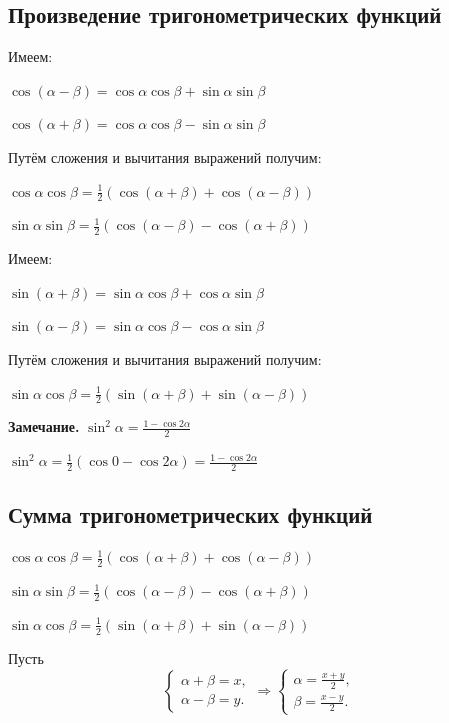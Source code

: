 \documentclass{article}
\begin{document}
        \subsection{Произведение тригонометрических функций}
        
        Имеем:
        
        \(\cos{(\alpha - \beta)} = \cos{\alpha}\cos{\beta} + \sin{\alpha}\sin{\beta}\)
        
        \(\cos{(\alpha + \beta)} = \cos{\alpha}\cos{\beta} - \sin{\alpha}\sin{\beta}\)
        
        Путём сложения и вычитания выражений получим:
        
        \(\cos{\alpha}\cos{\beta} = \frac{1}{2}(\cos{(\alpha + \beta)} + \cos{(\alpha - \beta)})\)
        
        \(\sin{\alpha}\sin{\beta} = \frac{1}{2}(\cos{(\alpha - \beta)} - \cos{(\alpha + \beta)})\)
        
        Имеем:
        
        \(\sin{(\alpha + \beta)} = \sin{\alpha}\cos{\beta} + \cos{\alpha}\sin{\beta}\)
        
        \(\sin{(\alpha - \beta)} = \sin{\alpha}\cos{\beta} - \cos{\alpha}\sin{\beta}\)
        
        Путём сложения и вычитания выражений получим:
        
        \(\sin{\alpha}\cos{\beta} = \frac{1}{2}(\sin{(\alpha + \beta)} + \sin{(\alpha - \beta)})\)
        
        \textbf{Замечание.} \(\sin^2{\alpha} = \frac{1 - \cos{2\alpha}}{2}\)
        
        \(\sin^2{\alpha} = \frac{1}{2}(\cos{0} - \cos{2\alpha}) = \frac{1 - \cos{2\alpha}}{2}\)
        
        \subsection{Сумма тригонометрических функций}
        
        \(\cos{\alpha}\cos{\beta} = \frac{1}{2}(\cos{(\alpha + \beta)} + \cos{(\alpha - \beta)})\)
        
        \(\sin{\alpha}\sin{\beta} = \frac{1}{2}(\cos{(\alpha - \beta)} - \cos{(\alpha + \beta)})\)
        
        \(\sin{\alpha}\cos{\beta} = \frac{1}{2}(\sin{(\alpha + \beta)} + \sin{(\alpha - \beta)})\)
        
        Пусть \begin{equation}
    			\begin{cases}
      				\alpha + \beta = x,\\
      				\alpha - \beta = y.
    			\end{cases}\Rightarrow
    			\begin{cases}
      				\alpha = \frac{x + y}{2},\\
      				\beta = \frac{x - y}{2}.
    			\end{cases}
			\end{equation}
        
\end{document}
